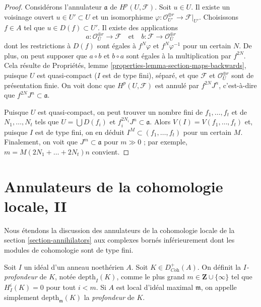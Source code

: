 \begin{proof}
Considérons l'annulateur $\mathfrak a$ de $H^p(U, \mathcal{F})$. Soit $u \in U$. Il existe un voisinage ouvert $u \in U' \subset U$ et un isomorphisme $\varphi : \mathcal{O}_{U'}^{\oplus r} \to \mathcal{F}|_{U'}$. Choisissons $f \in A$ tel que $u \in D(f) \subset U'$. Il existe des applications
$$
a : \mathcal{O}_U^{\oplus r} \longrightarrow \mathcal{F}
\quad\text{et}\quad
b : \mathcal{F} \longrightarrow \mathcal{O}_U^{\oplus r}
$$
dont les restrictions à $D(f)$ sont égales à $f^N \varphi$ et $f^N \varphi^{-1}$ pour un certain $N$. De plus, on peut supposer que $a \circ b$ et $b \circ a$ sont égales à la multiplication par $f^{2N}$. Cela résulte de Propriétés, lemme \ref{properties-lemma-section-maps-backwards}, puisque $U$ est quasi-compact ($I$ est de type fini), séparé, et que $\mathcal{F}$ et $\mathcal{O}_U^{\oplus r}$ sont de présentation finie. On voit donc que $H^p(U, \mathcal{F})$ est annulé par $f^{2N}J^n$, c'est-à-dire que $f^{2N}J^n \subset \mathfrak a$.

\medskip\noindent
Puisque $U$ est quasi-compact, on peut trouver un nombre fini de $f_1, \ldots, f_t$ et de $N_1, \ldots, N_t$ tels que $U = \bigcup D(f_i)$ et $f_i^{2N_i}J^n \subset \mathfrak a$. Alors $V(I) = V(f_1, \ldots, f_t)$ et, puisque $I$ est de type fini, on en déduit $I^M \subset (f_1, \ldots, f_t)$ pour un certain $M$. Finalement, on voit que $J^m \subset \mathfrak a$ pour $m \gg 0$ ; par exemple, $m = M (2N_1 + \ldots + 2N_t) n$ convient.
\end{proof}











\section{Annulateurs de la cohomologie locale, II}
\label{section-annihilators-II}

\noindent
Nous étendons la discussion des annulateurs de la cohomologie locale de la section \ref{section-annihilators} aux complexes bornés inférieurement dont les modules de cohomologie sont de type fini.

\begin{definition}
\label{definition-depth-complex}
Soit $I$ un idéal d'un anneau noethérien $A$. Soit $K \in D^+_{\textit{Coh}}(A)$. On définit la {\it $I$-profondeur} de $K$, notée $\text{depth}_I(K)$, comme le plus grand $m \in \mathbf{Z} \cup \{\infty\}$ tel que $H^i_I(K) = 0$ pour tout $i < m$. Si $A$ est local d'idéal maximal $\mathfrak m$, on appelle simplement $\text{depth}_\mathfrak m(K)$ la {\it profondeur} de $K$.
\end{definition}


